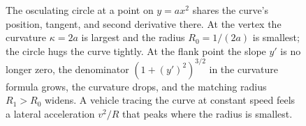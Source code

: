 \begin{figure}[ht]
\begin{tikzpicture}[x=1cm, y=1cm, font=\small]
\end{tikzpicture}
\caption[Radius of curvature and the osculating circle]{The
osculating circle at a point on $y = a x^{2}$ shares the curve's
position, tangent, and second derivative there. At the vertex the
curvature $\kappa = 2a$ is largest and the radius $R_{0} = 1/(2a)$
is smallest; the circle hugs the curve tightly. At the flank point
the slope $y'$ is no longer zero, the denominator
$(1 + (y')^{2})^{3/2}$ in the curvature formula grows, the curvature
drops, and the matching radius $R_{1} > R_{0}$ widens. A vehicle
tracing the curve at constant speed feels a lateral acceleration
$v^{2}/R$ that peaks where the radius is smallest.}
\label{fig:vol02:ch05:curvature}
\end{figure}
